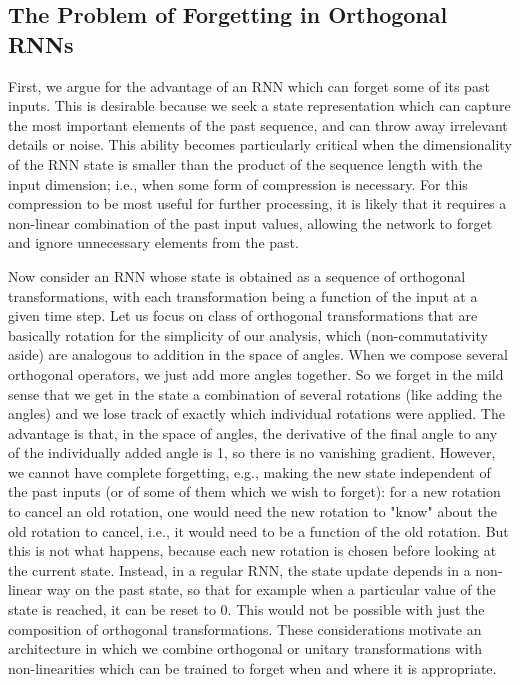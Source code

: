 \documentclass[letterpaper]{article} \usepackage{aaai18}  \usepackage{times}  \usepackage{helvet}  \usepackage{courier}  \usepackage{url}  \usepackage{graphicx}
\begin{document}
\subsection{The Problem of Forgetting in Orthogonal RNNs}


First, we argue for the advantage of an RNN which can forget some of its past inputs. This is desirable because we seek a state representation which can capture the most important elements of the past sequence, and can throw away irrelevant details or noise. This ability becomes particularly critical when the dimensionality of the RNN state is smaller than the product of the sequence length with the input dimension; i.e., when some form of compression is necessary. For this compression to be most useful for further processing, it is likely that it requires a non-linear combination of the past input values, allowing the network to forget and ignore unnecessary elements from the past.

Now consider an RNN whose state is obtained as a sequence of orthogonal transformations, with each transformation being a function of the input at a given time step. Let us focus on class of orthogonal transformations that are basically rotation for the simplicity of our analysis, which (non-commutativity aside) are analogous to addition in the space of angles. When we compose several orthogonal operators, we just add more angles together. So we forget in the mild sense that we get in the state a combination of several rotations (like adding the angles) and we lose track of exactly which individual rotations were applied. The advantage is that, in the space of angles, the derivative of the final angle to any of the individually added angle is 1, so there is no vanishing gradient. However, we cannot have complete forgetting, e.g., making the new state independent of the past inputs (or of some of them which we wish to forget): for a new rotation to cancel an old rotation, one would need the new rotation to "know" about the old rotation to cancel, i.e., it would need to be a function of the old rotation. But this is not what happens, because each new rotation is chosen before looking at the current state. Instead, in a regular RNN, the state update depends in a non-linear way on the past state, so that for example when a particular value of the state is reached, it can be reset to 0. This would not be possible with just the composition of orthogonal transformations. These considerations motivate an architecture in which we combine orthogonal or unitary transformations with non-linearities which can be trained to forget when and where it is appropriate.
\end{document}
